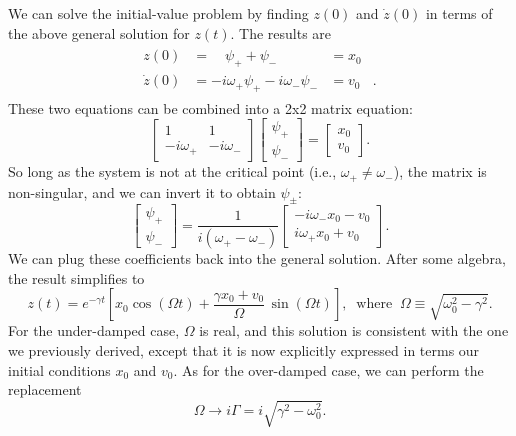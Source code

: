 \documentclass[10pt,a4paper]{article}
\begin{document}
We can solve the initial-value problem by finding $z(0)$ and
$\dot{z}(0)$ in terms of the above general solution for $z(t)$. The
results are
\begin{align}
  \begin{aligned}
  z(0) &= \quad \psi_+ + \psi_- &= x_0& \\
  \dot{z}(0) &= -i\omega_+ \psi_+ - i \omega_- \psi_- &= v_0&.
  \end{aligned}
\end{align}
These two equations can be combined into a 2x2 matrix equation:
\begin{equation}
\begin{bmatrix}1 & 1 \\ -i\omega_+ & -i\omega_-\end{bmatrix} \begin{bmatrix}\psi_+ \\ \psi_-\end{bmatrix} = \begin{bmatrix}x_0 \\ v_0\end{bmatrix}.
\end{equation}
So long as the system is not at the critical point (i.e.,
$\omega_+ \ne \omega_-$), the matrix is non-singular, and we can
invert it to obtain $\psi_\pm$:
\begin{equation}
\begin{bmatrix}\psi_+ \\ \psi_-\end{bmatrix} = \frac{1}{i(\omega_+-\omega_-)}\begin{bmatrix}-i\omega_-x_0 - v_0 \\ i\omega_+x_0 + v_0 \end{bmatrix}.
\end{equation}
We can plug these coefficients back into the general solution. After
some algebra, the result simplifies to
\begin{equation}
z(t) = e^{-\gamma t} \left[x_0 \cos(\Omega t) + \frac{\gamma x_0 + v_0}{\Omega} \, \sin(\Omega t)\right], \;\; \mathrm{where}\;\; \Omega \equiv \sqrt{\omega_0^2 - \gamma^2}.
\end{equation}
For the under-damped case, $\Omega$ is real, and this solution is
consistent with the one we previously derived, except that it is now
explicitly expressed in terms our initial conditions $x_0$ and
$v_0$. As for the over-damped case, we can perform the replacement
\begin{equation}
\Omega \rightarrow i \Gamma = i \sqrt{\gamma^2 - \omega_0^2}.
\end{equation}
\end{document}
